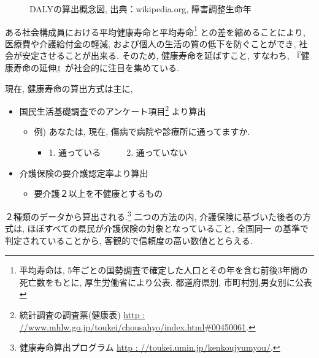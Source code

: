 \begin{figure}[h!]
	\begin{center}
			\caption{DALYの算出概念図, 出典：wikipedia.org, 障害調整生命年
		}
	\end{center}
\end{figure}



ある社会構成員における平均健康寿命と平均寿命\footnote{平均寿命は, 5年ごとの国勢調査で確定した人口とその年を含む前後3年間の死亡数をもとに, 厚生労働省により公表. 都道府県別, 市町村別,男女別に公表
}
との差を縮めることにより, 医療費や介護給付金の軽減, および個人の生活の質の低下を防ぐことができ, 社会が安定させることが出来る.
そのため, 健康寿命を延ばすこと, すなわち, 『健康寿命の延伸』が社会的に注目を集めている.
%

現在, 健康寿命の算出方式は主に,
\begin{itemize} \setlength{\itemsep}{-0.5mm} \setlength{\parskip}{-0.5mm}
	\item 国民生活基礎調査でのアンケート項目\footnote{
		      統計調査の調査票(健康表)
		      \url{http : //www.mhlw.go.jp/toukei/chousahyo/index.html#00450061}.
	      }
	      より算出
	      \begin{itemize} \setlength{\itemsep}{-0.5mm} \setlength{\parskip}{-0.5mm}
		      \item 例) あなたは, 現在, 傷病で病院や診療所に通ってますか.
		            \begin{itemize} \setlength{\itemsep}{-0.5mm} \setlength{\parskip}{-0.5mm}
			            \item[] 1. 通っている~~~~~~2. 通っていない
		            \end{itemize}
	      \end{itemize}

	\item 介護保険の要介護認定率より算出
	      \begin{itemize} \setlength{\itemsep}{-0.5mm} \setlength{\parskip}{-0.5mm}
		      \item 要介護２以上を不健康とするもの
	      \end{itemize}
\end{itemize}
２種類のデータから算出される.\footnote{
	健康寿命算出プログラム
	\url{http : //toukei.umin.jp/kenkoujyumyou/}.
}
二つの方法の内, 介護保険に基づいた後者の方式は,
ほぼすべての県民が介護保険の対象となっていること, 全国同一
の基準で判定されていることから, 客観的で信頼度の高い数値ととらえる.




